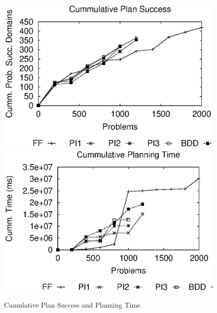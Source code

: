 \documentclass{article}
\begin{document}
\begin{figure}[t]\vspace*{-.5cm}
\centering\includegraphics[width=.9\linewidth]{./alldom-deadline.eps}\\
\includegraphics[width=.9\linewidth]{./alldom-deadline-time.eps}
\caption{\label{fig:plan} Cumulative Plan Success and Planning Time}
\end{figure}		
\end{document}
